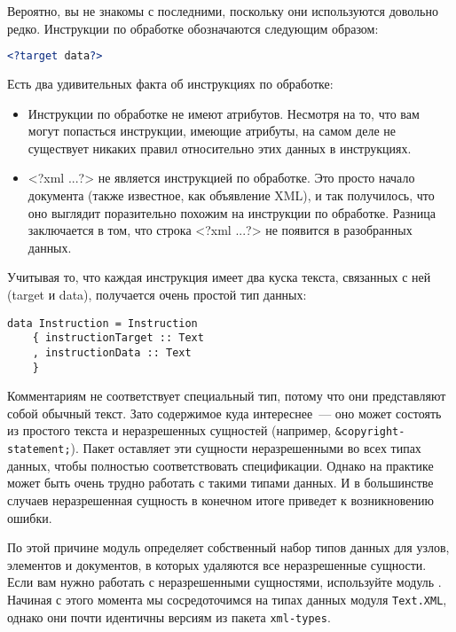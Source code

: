 \begin{remark}
Вероятно, вы не знакомы с последними, поскольку они используются довольно редко. Инструкции по обработке обозначаются следующим образом:

\begin{lstlisting}[language=XML]
<?target data?>
\end{lstlisting}

Есть два удивительных факта об инструкциях по обработке:

\begin{itemize}
\item Инструкции по обработке не имеют атрибутов. Несмотря на то, что вам могут попасться инструкции, имеющие атрибуты, на самом деле не существует никаких правил относительно этих данных в инструкциях. %
\item <?xml ...?> не является инструкцией по обработке. Это просто начало документа (также известное, как объявление XML), и так получилось, что оно выглядит поразительно похожим на инструкции по обработке. Разница заключается в том, что строка <?xml ...?> не появится в разобранных данных.
\end{itemize}

\end{remark}

Учитывая то, что каждая инструкция имеет два куска текста, связанных с ней (target и data), получается очень простой тип данных:

\begin{lstlisting}
data Instruction = Instruction
    { instructionTarget :: Text
    , instructionData :: Text
    }
\end{lstlisting}

Комментариям не соответствует специальный тип, потому что они представляют собой обычный текст. Зато содержимое куда интереснее~--- оно может состоять из простого текста и неразрешенных сущностей (например, \lstinline!&copyright-statement;!). Пакет  оставляет эти сущности неразрешенными во всех типах данных, чтобы полностью соответствовать спецификации. Однако на практике может быть очень трудно работать с такими типами данных. И в большинстве случаев неразрешенная сущность в конечном итоге приведет к возникновению ошибки.

По этой причине модуль  определяет собственный набор типов данных для узлов, элементов и документов, в которых удаляются все неразрешенные сущности. Если вам нужно работать с неразрешенными сущностями, используйте модуль . Начиная с этого момента мы сосредоточимся на типах данных модуля \lstinline!Text.XML!, однако они почти идентичны версиям из пакета \lstinline!xml-types!.

